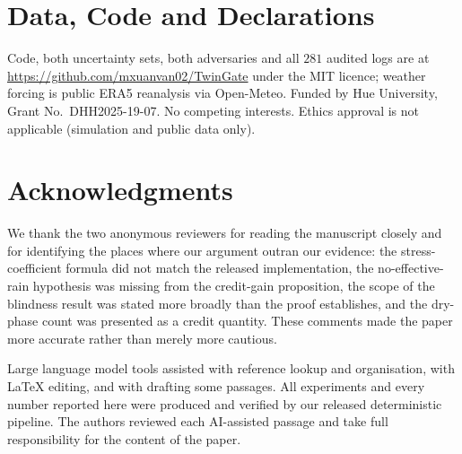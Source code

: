 


\section*{Data, Code and Declarations}

Code, both uncertainty sets, both adversaries and all $281$ audited logs are at
\url{https://github.com/mxuanvan02/TwinGate} under the MIT licence; weather forcing is
public ERA5 reanalysis via Open-Meteo. Funded by Hue University, Grant
No.~DHH2025-19-07. No competing interests. Ethics approval is not applicable
(simulation and public data only).

\section*{Acknowledgments}

We thank the two anonymous reviewers for reading the manuscript closely and for
identifying the places where our argument outran our evidence: the stress-coefficient
formula did not match the released implementation, the no-effective-rain hypothesis was
missing from the credit-gain proposition, the scope of the blindness result was stated
more broadly than the proof establishes, and the dry-phase count was presented as a
credit quantity. These comments made the paper more accurate rather than merely more
cautious.

Large language model tools assisted with reference lookup and organisation, with
\LaTeX{} editing, and with drafting some passages. All experiments and every number
reported here were produced and verified by our released deterministic pipeline. The
authors reviewed each AI-assisted passage and take full responsibility for the content
of the paper.







